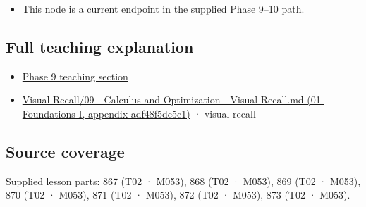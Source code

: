 \begin{itemize}
\tightlist
\item
  This node is a current endpoint in the supplied Phase 9--10 path.
\end{itemize}

\subsection{Full teaching explanation}\label{appendix-54c8f5828387-full-teaching-explanation}

\begin{itemize}
\tightlist
\item
  \hyperref[02-foundations-ii-ch026-optimization-and-inverse-problems]{Phase 9 teaching section}
\item
  \href{../01-Foundations-I/main.pdf\#nameddest=appendix-adf48f5dc5c1}{Visual Recall/09 - Calculus and Optimization - Visual Recall.md (01-Foundations-I, appendix-adf48f5dc5c1)} · visual recall
\end{itemize}

\subsection{Source coverage}\label{appendix-54c8f5828387-source-coverage}

Supplied lesson parts: 867 (T02 · M053), 868 (T02 · M053), 869 (T02 · M053), 870 (T02 · M053), 871 (T02 · M053), 872 (T02 · M053), 873 (T02 · M053).
